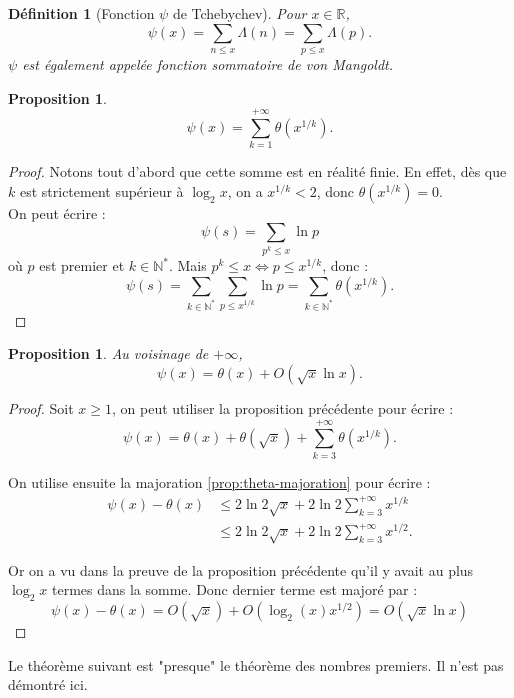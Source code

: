\documentclass[french]{report}
\newtheorem{definition}[theorem]{Définition}
\newtheorem{proposition}[theorem]{Proposition}
\begin{document}
\begin{definition}[Fonction $\psi$ de Tchebychev] Pour $x\in \mathbb{R}$,
  \[
    \psi(x)
    = \sum_{n \le x}\Lambda (n)
    = \sum_{p \le x}\Lambda (p).
  \]
  $\psi$ est également appelée fonction sommatoire de von Mangoldt.
\end{definition}

\begin{proposition}
  \[
    \psi(x) = \sum_{k=1}^{+\infty}\theta(x^{1/k}).
  \]
\end{proposition}

\begin{proof}
  Notons tout d'abord que cette somme est en réalité finie. En effet, dès que $k$ est strictement supérieur à $\log_2 x$, on a $x^{1/k}<2$, donc $\theta(x^{1/k})=0$.
  \\

  On peut écrire :
  \[
    \psi(s) = \sum_{p^k\leq x}\ln p  
  \]
  où $p$ est premier et $k\in\mathbb{N}^*$. Mais $p^k\leq x\Leftrightarrow p\leq x^{1/k}$, donc :
  \[
    \psi(s)
    = \sum_{k\in\mathbb{N}^*}\sum_{p\leq x^{1/k}}\ln p 
    = \sum_{k\in\mathbb{N}^*}\theta(x^{1/k}).
  \]
\end{proof}

\begin{proposition}\label{prop:relation-psi-theta}
  Au voisinage de $+\infty$,
  \[
    \psi(x) = \theta(x) + O(\sqrt{x}\ln x).
  \]
\end{proposition}

\begin{proof}
  Soit $x\geq1$, on peut utiliser la proposition précédente pour écrire :
  \[
    \psi(x)
    = \theta(x) + \theta(\sqrt{x})
    + \sum_{k=3}^{+\infty}\theta(x^{1/k}).
  \]

  On utilise ensuite la majoration \ref{prop:theta-majoration} pour écrire :
  \begin{align*}
    \psi(x)-\theta(x)
    &\leq 2\ln2\sqrt{x}
    + 2\ln2\sum_{k=3}^{+\infty}x^{1/k} \\
    &\leq 2\ln2\sqrt{x}
    + 2\ln2\sum_{k=3}^{+\infty}x^{1/2}.
  \end{align*}

  Or on a vu dans la preuve de la proposition précédente qu'il y avait au plus $\log_2x$ termes dans la somme. Donc dernier terme est majoré par :
  \[
    \psi(x)-\theta(x)
    = O(\sqrt{x}) + O(\log_2(x)x^{1/2}) = O(\sqrt{x}\ln x)
  \]
\end{proof}

Le théorème suivant est "presque" le théorème des nombres premiers. Il n'est pas démontré ici.
\end{document}
